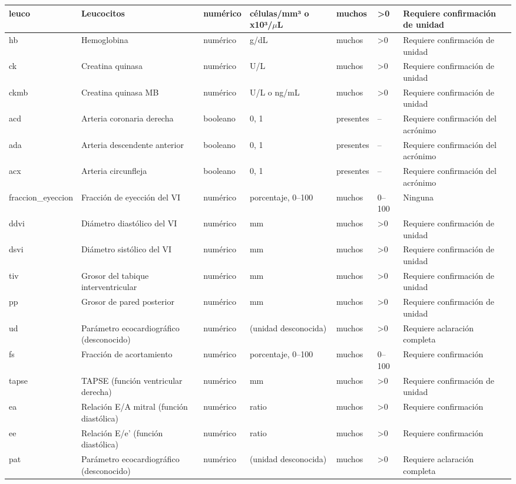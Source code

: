 \documentclass[11pt,a4paper]{article}
\begin{document}
\begin{longtable}{|L{0.095\textwidth}|L{0.17\textwidth}|L{0.07\textwidth}|L{0.16\textwidth}|L{0.14\textwidth}|L{0.13\textwidth}|L{0.15\textwidth}|}
leuco & Leucocitos & numérico & células/mm³ o x10³/$\mu$L & muchos & >0 & Requiere confirmación de unidad \\ \hline
hb & Hemoglobina & numérico & g/dL & muchos & >0 & Requiere confirmación de unidad \\ \hline
ck & Creatina quinasa & numérico & U/L & muchos & >0 & Requiere confirmación de unidad \\ \hline
ckmb & Creatina quinasa MB & numérico & U/L o ng/mL & muchos & >0 & Requiere confirmación de unidad \\ \hline
acd & Arteria coronaria derecha & booleano & 0, 1 & presentes & -- & Requiere confirmación del acrónimo \\ \hline
ada & Arteria descendente anterior & booleano & 0, 1 & presentes & -- & Requiere confirmación del acrónimo \\ \hline
acx & Arteria circunfleja & booleano & 0, 1 & presentes & -- & Requiere confirmación del acrónimo \\ \hline
fraccion\_eyeccion & Fracción de eyección del VI & numérico & porcentaje, 0--100 & muchos & 0--100 & Ninguna \\ \hline
ddvi & Diámetro diastólico del VI & numérico & mm & muchos & >0 & Requiere confirmación de unidad \\ \hline
dsvi & Diámetro sistólico del VI & numérico & mm & muchos & >0 & Requiere confirmación de unidad \\ \hline
tiv & Grosor del tabique interventricular & numérico & mm & muchos & >0 & Requiere confirmación de unidad \\ \hline
pp & Grosor de pared posterior & numérico & mm & muchos & >0 & Requiere confirmación de unidad \\ \hline
ud & Parámetro ecocardiográfico (desconocido) & numérico & (unidad desconocida) & muchos & >0 & Requiere aclaración completa \\ \hline
fs & Fracción de acortamiento & numérico & porcentaje, 0--100 & muchos & 0--100 & Requiere confirmación \\ \hline
tapse & TAPSE (función ventricular derecha) & numérico & mm & muchos & >0 & Requiere confirmación de unidad \\ \hline
ea & Relación E/A mitral (función diastólica) & numérico & ratio & muchos & >0 & Requiere confirmación \\ \hline
ee & Relación E/e' (función diastólica) & numérico & ratio & muchos & >0 & Requiere confirmación \\ \hline
pat & Parámetro ecocardiográfico (desconocido) & numérico & (unidad desconocida) & muchos & >0 & Requiere aclaración completa \\ \hline

\end{longtable}
\end{document}
